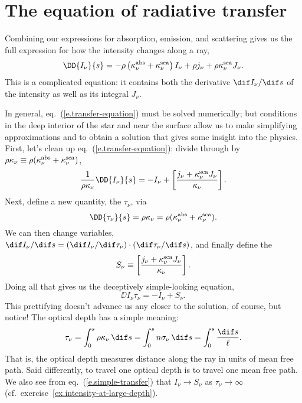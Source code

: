 \section{The equation of radiative transfer}
\label{s.equation-radiative-transfer}

Combining our expressions for absorption, emission, and scattering gives us the full expression for how the intensity changes along a ray,
\begin{equation}\label{e.transfer-equation}
\DD{I_{\nu}}{s} = -\rho\left(\kapabs + \kapscat\right) I_{\nu} + \rho j_{\nu} + \rho\kapscat J_{\nu}.
\end{equation}
This is a complicated  equation: it contains both the derivative $\dif I_{\nu}/\dif s$ of the intensity as well as its integral $J_{\nu}$.

In general, eq.~(\ref{e.transfer-equation}) must be solved numerically; but conditions in the deep interior of the star and near the surface allow us to make simplifying approximations and to obtain a solution that gives some insight into the physics. First, let's clean up eq.~(\ref{e.transfer-equation}): divide through by $\rho\kappa_{\nu}\equiv\rho(\kappa_\nu^{\mathrm{abs}} + \kappa_\nu^{\mathrm{sca}})$,
\[
	\frac{1}{\rho\kappa_{\nu}}\DD{I_{\nu}}{s} = -I_{\nu} + \left[\frac{j_{\nu} + \kapscat J_{\nu}}{\kappa_{\nu}}\right].
\]
Next, define a new quantity, the  $\tau_{\nu}$, via
\[
	\DD{\tau_{\nu}}{s} = \rho\kappa_{\nu} = \rho(\kapabs+\kapscat).
\]
We can then change variables, $\dif I_{\nu}/\dif s = (\dif I_{\nu}/\dif\tau_{\nu})\cdot(\dif\tau_{\nu}/\dif s)$, and finally define the 
\[ S_{\nu} \equiv \left[\frac{j_{\nu} + \kappa_\nu^{\mathrm{sca}} J_{\nu}}{\kappa_{\nu}}\right].\]
Doing all that gives us the deceptively simple-looking equation,
\begin{equation}\label{e.simple-transfer}
	\DD{I_{\nu}}{\tau_{\nu}} = -I_{\nu} + S_{\nu}.
\end{equation}
This prettifying doesn't advance us any closer to the solution, of course, but notice! The optical depth has a simple meaning:
\[
	\tau_{\nu} = \int_{0}^{s} \rho\kappa_{\nu}\,\dif s = \int_{0}^{s} n\sigma_{\nu}\,\dif s = \int_{0}^{s} \frac{\dif s}{\ell}.
\]
That is, the optical depth measures distance along the ray in units of mean free path. Said differently, to travel one optical depth is to travel one mean free path. We also see from eq.~(\ref{e.simple-transfer}) that $I_{\nu}\to S_{\nu}$ as $\tau_{\nu}\to\infty$ (cf.\ exercise~\ref{ex.intensity-at-large-depth}).

